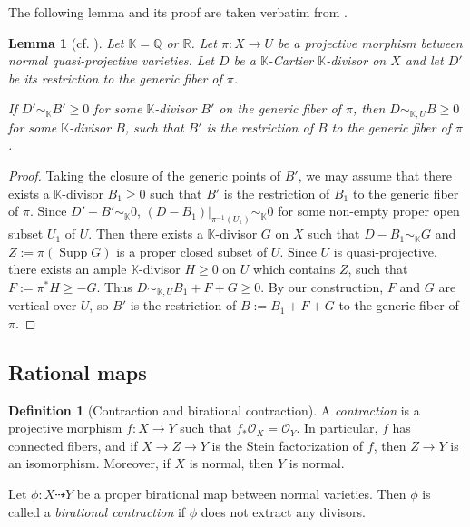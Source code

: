 \documentclass[11pt]{amsart}
\numberwithin{equation}{section}
\newcommand{\Supp}{\operatorname{Supp}}
\newtheorem{lem}[thm]{Lemma}
\theoremstyle{definition}
\newtheorem{defn}[thm]{Definition}
\theoremstyle{definition}
\theoremstyle{definition}
\begin{document}
The following lemma and its proof are taken verbatim from \cite[Lemma 3.2.1]{BCHM10}. 
\begin{lem}[cf. {\cite[Lemma 3.2.1]{BCHM10}}]\label{lem: lift equivalence from generic fiber}
Let $\mathbb K=\mathbb Q$ or $\mathbb R$. Let $\pi: X\rightarrow U$ be a projective morphism between normal quasi-projective varieties. Let $D$ be a $\mathbb K$-Cartier $\mathbb K$-divisor on $X$ and let $D'$ be its restriction to the generic fiber of $\pi$.

If $D'\sim_{\mathbb K} B'\geq 0$ for some $\mathbb K$-divisor $B'$ on the generic fiber of $\pi$, then $D\sim_{\mathbb K,U}B\geq 0$ for some $\mathbb K$-divisor $B$, such that $B'$ is the restriction of $B$ to the generic fiber of $\pi$. 
\end{lem}
\begin{proof}
Taking the closure of the generic points of $B'$, we may assume that there exists a $\mathbb K$-divisor $B_1\geq 0$ such that $B'$ is the restriction of $B_1$ to the generic fiber of $\pi$. Since $D'-B'\sim_{\mathbb K} 0$, $(D-B_1)|_{\pi^{-1}(U_1)}\sim_{\mathbb K} 0$ for some non-empty proper open subset $U_1$ of $U$. Then there exists a $\mathbb K$-divisor $G$ on $X$ such that $D-B_1\sim_{\mathbb K} G$ and $Z:=\pi(\Supp G)$ is a proper closed subset of $U$. Since $U$ is quasi-projective, there exists an ample $\mathbb K$-divisor $H\geq 0$ on $U$ which contains $Z$, such that $F:=\pi^*H\geq -G$. Thus $D\sim_{\mathbb K,U} B_1+F+G\geq 0$. By our construction, $F$ and $G$ are vertical over $U$, so $B'$ is the restriction of $B:=B_1+F+G$ to the generic fiber of $\pi$. 
\end{proof}


\subsection{Rational maps}

\begin{defn}[Contraction and birational contraction]
A \emph{contraction} is a projective morphism $f: X\rightarrow Y$ such that $f_*\mathcal{O}_X=\mathcal{O}_Y$. In particular, $f$ has connected fibers, and if $X\rightarrow Z\rightarrow Y$ is the Stein factorization of $f$, then $Z\rightarrow Y$ is an isomorphism. Moreover, if $X$ is normal, then $Y$ is normal.

Let $\phi: X\dashrightarrow Y$ be a proper birational map between normal varieties. Then $\phi$ is called a \emph{birational contraction} if $\phi$ does not extract any divisors. 
\end{defn}
\end{document}
